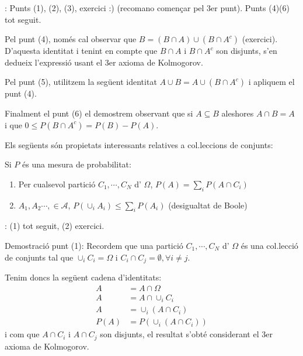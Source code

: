 \documentclass[letterpaper,10pt,english]{sphinxmanual}
\begin{document}
: Punts (1), (2), (3), exercici :) (recomano començar pel 3er punt).
Punts (4)\sphinxhyphen{}(6) tot seguit.

Pel punt (4), només cal observar que \(B = \left(B \cap A\right) \cup \left(B \cap A^c\right)\) (exercici).
D’aquesta identitat i tenint en compte que \(B \cap A\) i \(B \cap A^c\) son disjunts,
s’en dedueix l’expressió usant el 3er axioma de Kolmogorov.

Pel punt (5), utilitzem la següent identitat \(A \cup B = A \cup \left(B \cap A^c\right)\) i apliquem el punt (4).

Finalment el punt (6) el demostrem observant que si \(A \subseteq B\) aleshores \(A \cap B = A\)
i que \(0 \leq P\left(B \cap A^c\right) = P\left(B\right) - P\left(A\right)\).

Els següents són propietats interessants relatives a col.leccions de conjunts:

 Si \(P\) és una mesura de probabilitat:
\begin{enumerate}
%
\item {} 
Per cualsevol partició \(C_1, \cdots, C_N\) d’ \(\Omega\), \(P\left(A\right) = \sum_i P\left(A \cap C_i \right)\)

\item {} 
\(A_1, A_2 \cdots, \in \mathcal{A}\), \(P\left(\cup_i A_i\right) \leq \sum_i P\left(A_i \right)\) (desigualtat de Boole)

\end{enumerate}

: (1) tot seguit, (2) exercici.

Demostració punt (1): Recordem que una partició \(C_1, \cdots, C_N\) d’ \(\Omega\)
és una col.lecció de conjunts tal que \(\cup_i C_i = \Omega\) i \(C_i \cap C_j = \emptyset, \forall i\neq j\).

Tenim doncs la següent cadena d’identitats:
\begin{equation*}
\begin{split}A &= A \cap \Omega \\
A & = A \cap \cup_i C_i \\
A & = \cup_i \left( A \cap C_i \right)\\
P\left(A\right) & = P\left(\cup_i \left( A \cap C_i\right)\right)\end{split}
\end{equation*}
i com que \(A \cap C_i\) i \(A \cap C_j\) son disjunts, el resultat
s’obté considerant el 3er axioma de Kolmogorov.
\end{document}
